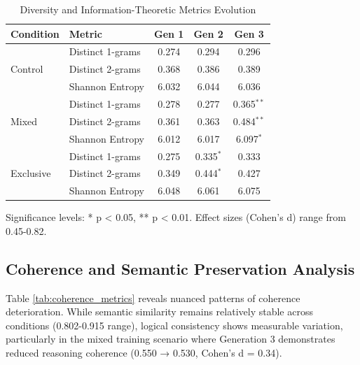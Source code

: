 \documentclass{article}
\begin{document}
\begin{table}[H]
\centering
\caption{Diversity and Information-Theoretic Metrics Evolution}
\label{tab:diversity_evolution}
\begin{tabular}{llccc}
\toprule
\textbf{Condition} & \textbf{Metric} & \textbf{Gen 1} & \textbf{Gen 2} & \textbf{Gen 3} \\
\midrule
\multirow{3}{*}{Control} & Distinct 1-grams & 0.274 & 0.294 & 0.296 \\
 & Distinct 2-grams & 0.368 & 0.386 & 0.389 \\
 & Shannon Entropy & 6.032 & 6.044 & 6.036 \\
\midrule
\multirow{3}{*}{Mixed} & Distinct 1-grams & 0.278 & 0.277 & 0.365$^{**}$ \\
 & Distinct 2-grams & 0.361 & 0.363 & 0.484$^{**}$ \\
 & Shannon Entropy & 6.012 & 6.017 & 6.097$^{*}$ \\
\midrule
\multirow{3}{*}{Exclusive} & Distinct 1-grams & 0.275 & 0.335$^{*}$ & 0.333 \\
 & Distinct 2-grams & 0.349 & 0.444$^{*}$ & 0.427 \\
 & Shannon Entropy & 6.048 & 6.061 & 6.075 \\
\bottomrule
\end{tabular}
\footnotesize{Significance levels: * p < 0.05, ** p < 0.01. Effect sizes (Cohen's d) range from 0.45-0.82.}
\end{table}

\subsection{Coherence and Semantic Preservation Analysis}

Table \ref{tab:coherence_metrics} reveals nuanced patterns of coherence deterioration. While semantic similarity remains relatively stable across conditions (0.802-0.915 range), logical consistency shows measurable variation, particularly in the mixed training scenario where Generation 3 demonstrates reduced reasoning coherence (0.550 → 0.530, Cohen's d = 0.34).
\end{document}
